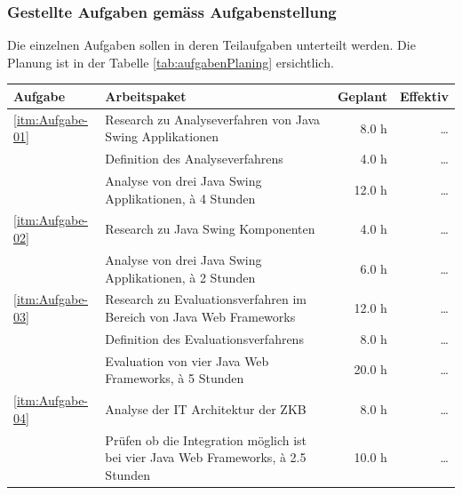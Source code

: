   \newpage
  
  \subsubsection{Gestellte Aufgaben gemäss Aufgabenstellung}
  
  Die einzelnen Aufgaben sollen in deren Teilaufgaben unterteilt werden. Die
  Planung ist in der Tabelle \ref{tab:aufgabenPlaning} ersichtlich.
  \newline
  
  \begin{table}[!h]
    \sffamily 
    \begin{center}
      \begin{tabular}{lp{7cm}rr}
        \toprule
        Aufgabe & Arbeitspaket & Geplant & Effektiv \\

        \midrule
        \ref{itm:Aufgabe-01} &
        Research zu Analyseverfahren von Java Swing Applikationen &
        8.0 h &
        \ldots\\
        &
        Definition des Analyseverfahrens &
        4.0 h &
        \ldots\\
        &
        Analyse von drei Java Swing Applikationen, à 4 Stunden &
        12.0 h &
        \ldots\\

        \midrule
        \ref{itm:Aufgabe-02} &
        Research zu Java Swing Komponenten &
        4.0 h &
        \ldots\\
        &
        Analyse von drei Java Swing Applikationen, à 2 Stunden &
        6.0 h &
        \ldots\\

        \midrule
        \ref{itm:Aufgabe-03} &
        Research zu Evaluationsverfahren im Bereich von Java Web Frameworks &
        12.0 h &
        \ldots\\
        &
        Definition des Evaluationsverfahrens &
        8.0 h &
        \ldots\\
        &
        Evaluation von vier Java Web Frameworks, à 5 Stunden &
        20.0 h &
        \ldots\\

        \midrule
        \ref{itm:Aufgabe-04} &
        Analyse der IT Architektur der ZKB &
        8.0 h &
        \ldots\\
        &
        Prüfen ob die Integration möglich ist bei vier Java Web Frameworks, à
        2.5 Stunden &
        10.0 h &
        \ldots\\
        

\end{tabular}
\end{center}
\end{table}
